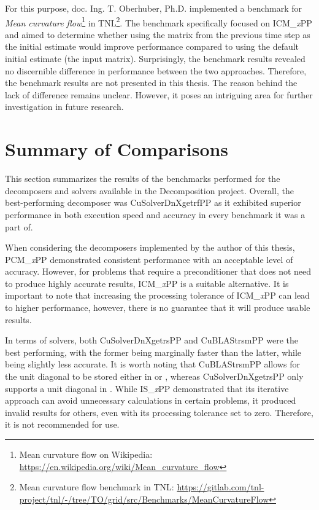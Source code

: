 For this purpose, doc. Ing. T. Oberhuber, Ph.D. implemented a benchmark for \textit{Mean curvature flow}\footnote{Mean curvature flow on Wikipedia: \url{https://en.wikipedia.org/wiki/Mean_curvature_flow}} in TNL\footnote{Mean curvature flow benchmark in TNL: \url{https://gitlab.com/tnl-project/tnl/-/tree/TO/grid/src/Benchmarks/MeanCurvatureFlow}}.
The benchmark specifically focused on ICM\_\textit{x}PP and aimed to determine whether using the  matrix from the previous time step as the initial estimate would improve performance compared to using the default initial estimate (the input matrix).
Surprisingly, the benchmark results revealed no discernible difference in performance between the two approaches.
Therefore, the benchmark results are not presented in this thesis.
The reason behind the lack of difference remains unclear.
However, it poses an intriguing area for further investigation in future research.




\section{Summary of Comparisons}\label{Section:comparing-decomposers-and-solvers->summary-of-comparisons}
This section summarizes the results of the benchmarks performed for the decomposers and solvers available in the Decomposition project.
Overall, the best-performing decomposer was CuSolverDnXgetrfPP as it exhibited superior performance in both execution speed and accuracy in every benchmark it was a part of.

When considering the decomposers implemented by the author of this thesis, PCM\_\textit{x}PP demonstrated consistent performance with an acceptable level of accuracy.
However, for problems that require a preconditioner that does not need to produce highly accurate results, ICM\_\textit{x}PP is a suitable alternative.
It is important to note that increasing the processing tolerance of ICM\_\textit{x}PP can lead to higher performance, however, there is no guarantee that it will produce usable results.

In terms of solvers, both CuSolverDnXgetrsPP and CuBLAStrsmPP were the best performing, with the former being marginally faster than the latter, while being slightly less accurate.
It is worth noting that CuBLAStrsmPP allows for the unit diagonal to be stored either in  or , whereas CuSolverDnXgetrsPP only supports a unit diagonal in .
While IS\_\textit{x}PP demonstrated that its iterative approach can avoid unnecessary calculations in certain problems, it produced invalid results for others, even with its processing tolerance set to zero.
Therefore, it is not recommended for use.